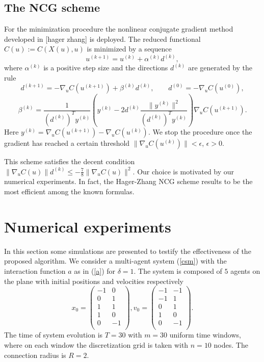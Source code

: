 \documentclass[a4paper,10pt, english]{article}
\begin{document}
 \subsection{The NCG scheme}
  For the minimization procedure the nonlinear conjugate gradient  method developed in [hager zhang] is deployed.
  The reduced functional $C(u):=C(X(u), u)$ is minimized by a sequence
  \begin{equation}
  u^{(k+1)} =   u^{(k)} + \alpha^{(k)} d^{(k)},
  \label{ncgscheme}
   \end{equation}  
  where $\alpha^{(k)}$ is a positive step size and the directions $d^{(k)}$ are generated by the rule
  \begin{equation}
  d^{(k+1)} = - \nabla_u C(u^{(k+1)}) + \beta^{(k)} d^{(k)}, \qquad d^{(0)} = -\nabla_u C(u^{(0)}),
  \label{drct}
  \end{equation}
  \begin{equation}
  \beta^{(k)} = \frac{1}{(d^{(k)})^T y^{(k)}} \left( y^{(k)} - 2d^{(k)}\frac{\|y^{(k)}\|^2}{(d^{(k)})^T y^{(k)}}\right)\nabla_u C(u^{(k+1)}).
  \label{drct}
  \end{equation}  
  Here $y^{(k)} = \nabla_u C(u^{(k+1)}) - \nabla_u C(u^{(k)})$. 
  We stop the procedure once the gradient has reached a certain threshold $\|\nabla_u C(u^{(k)})\| < \epsilon$, $\epsilon > 0$.
   
  This scheme satisfies the decent condition $\|\nabla_u C(u)\|d^{(k)} \leq -\frac{7}{8}\|\nabla_u C(u)\|^2$. Our choice is motivated by our numerical experiments. In fact, the Hager-Zhang NCG scheme results to be the most efficient among the known formulas. 
  
  
 
 
 \newpage
 \section{Numerical experiments}
In this section some simulations are presented to testify the effectiveness of the proposed algorithm. We consider a multi-agent system (\ref{csm}) with the interaction function 
$a$ as in (\ref{a}) for $\delta = 1$. The system is composed of $5$
agents on the plane with initial positions and velocities respectively
\[x_0 =  \left( \begin{array}{cc}
		  -1  &   0\\
           0  &   1\\
           1  &   1\\
           1  &   0\\
           0 &   -1\\
\end{array} \right),
%
v_0 = 
\left( \begin{array}{cc}
	     -1&  -1\\
	     -1&   1\\
	      0&   1\\
	      1&   0\\
	      0&  -1\\
\end{array} \right).
\]
The time of system evolution is $T = 30$ with  $m = 30$ uniform time windows, where  on each window the discretization grid
is taken with $n = 10$ nodes.  The connection radius is $R = 2$. 
\end{document}
